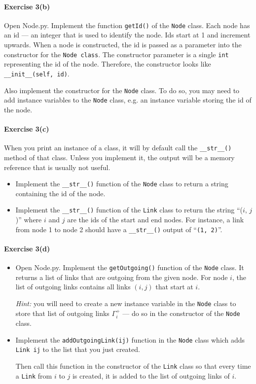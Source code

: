 \documentclass[11pt]{article}
\begin{document}
\paragraph*{Exercise 3(b)} Open Node.py. Implement the function \texttt{getId()} of the \texttt{Node} class. 
Each node has an id --- an integer that is used to identify the node. Ids start at 1 and increment upwards.  When a node is constructed, the id is passed as a parameter into the constructor for the \texttt{Node class}. The constructor parameter is a single \texttt{int} representing the id of the node. Therefore, the constructor looks like \texttt{\_\_init\_\_(self, id)}.


Also implement the constructor for the \texttt{Node} class. To do so, you may need to add instance variables to the \texttt{Node} class, e.g. an instance variable storing the id of the node.


\paragraph*{Exercise 3(c)}
When you print an instance of a class, it will by default call the \texttt{\_\_str\_\_()} method of that class. Unless you implement it, the output will be a memory reference that is usually not useful.
\begin{itemize}
	 \item Implement the \texttt{\_\_str\_\_()} function of the \texttt{Node} class to return a string containing the id of the node.
	  \item Implement the \texttt{\_\_str\_\_()} function of the \texttt{Link} class to return the string ``($i$, $j$)'' where $i$ and $j$ are the ids of the start and end nodes. For instance, a link from node 1 to node 2 should have a \texttt{\texttt{\_\_str\_\_()}} output of ``\texttt{(1, 2)}''. 
\end{itemize}
% 



\paragraph*{Exercise 3(d)} 
\begin{itemize}
	\item Open Node.py. Implement the \texttt{getOutgoing()} function of the \texttt{Node} class. It returns a list of links that are outgoing from the given node. For node $i$, the list of outgoing links contains all links $(i, j)$ that start at $i$.
	
	\textit{Hint:} you will need to create a new instance variable  in the \texttt{Node} class to store that list of outgoing links $\Gamma^+_i$ --- do so in the constructor of the \texttt{Node} class.
	
	
	\item Implement the \texttt{addOutgoingLink(ij)} function  in the \texttt{Node} class which adds \texttt{Link ij}  to the list that you just created. 
	
	Then call this function in the constructor of the \texttt{Link} class so that every time a \texttt{Link} from $i$ to $j$ is created, it is added to the list of outgoing links of $i$.
\end{itemize}
\end{document}

